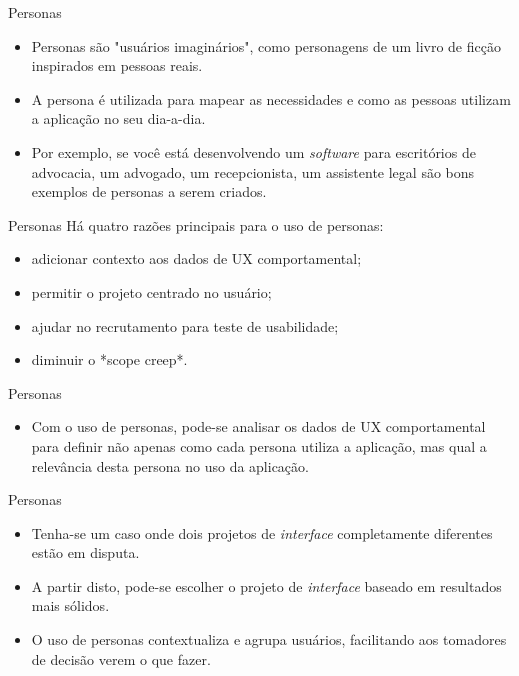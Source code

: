 \documentclass[11pt]{beamer}
\begin{document}
   \begin{frame}{Personas}
      \begin{itemize}
         \item Personas são "usuários imaginários", como personagens de um livro de ficção inspirados em pessoas reais.
         \item A persona é utilizada para mapear as necessidades e como as pessoas utilizam a aplicação no seu dia-a-dia.
         \item Por exemplo, se você está desenvolvendo um \textit{software} para escritórios de advocacia, um advogado, um recepcionista, um assistente legal são bons exemplos de personas a serem criados.
      \end{itemize}
   \end{frame}

   \begin{frame}{Personas}
      Há quatro razões principais para o uso de personas:
      \begin{itemize}
         \item adicionar contexto aos dados de UX comportamental;
         \item permitir o projeto centrado no usuário;
         \item ajudar no recrutamento para teste de usabilidade;
         \item diminuir o *scope creep*.
      \end{itemize}
   \end{frame}

   \begin{frame}{Personas}
      \begin{itemize}
         \item Com o uso de personas, pode-se analisar os dados de UX comportamental para definir não apenas como cada persona utiliza a aplicação, mas qual a relevância desta persona no uso da aplicação.
      \end{itemize}   
   \end{frame}

   \begin{frame}{Personas}
      \begin{itemize}
         \item Tenha-se um caso onde dois projetos de \textit{interface} completamente diferentes estão em disputa. 
         \item A partir disto, pode-se escolher o projeto de \textit{interface} baseado em resultados mais sólidos.
         \item O uso de personas contextualiza e agrupa usuários, facilitando aos tomadores de decisão verem o que fazer.
      \end{itemize}
   \end{frame}
\end{document}
